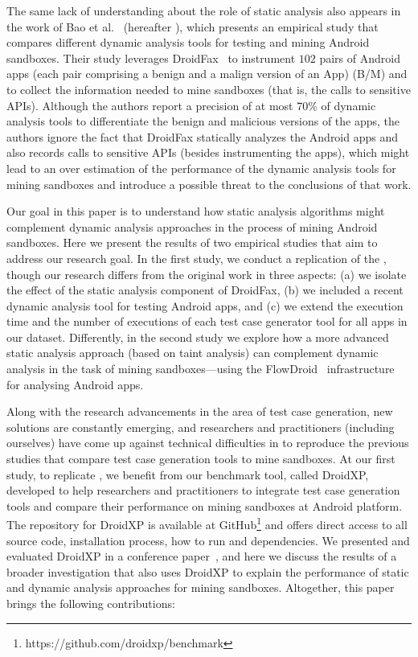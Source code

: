 The same lack of understanding about the role of static analysis also appears in the work of Bao et al.~\cite{DBLP:conf/wcre/BaoLL18} (hereafter \blls), which presents an empirical study that compares different dynamic analysis tools for testing and mining Android sandboxes. Their study leverages DroidFax~\cite{DBLP:conf/icsm/CaiR17a} to instrument $102$ pairs of Android apps (each pair comprising a benign and a malign version of an App) (B/M) and to collect the information needed to mine sandboxes (that is, the calls to sensitive APIs).
Although the authors report a precision of at most 70\% of dynamic analysis tools to differentiate the benign and malicious versions of the apps, the authors ignore the fact that DroidFax statically analyzes the Android apps and also records calls to sensitive APIs (besides instrumenting the apps), which might lead to an over estimation of the performance of the dynamic analysis tools for mining sandboxes and introduce a possible threat to the conclusions of that work.

Our goal in this paper is to understand how static analysis
algorithms might complement dynamic analysis approaches in the process of mining Android sandboxes. Here we
present the results of two empirical studies that aim to
address our research goal. In the
first study, we conduct a replication of the \blls, though our research differs from the original work in three aspects: (a)
we isolate the effect of the static analysis component of DroidFax, (b) we included a recent dynamic analysis tool for testing Android apps,
and (c) we extend the execution time and the number of executions of each test case generator tool for all apps
in our dataset. Differently, in the second study we explore how a more advanced static analysis approach
(based on taint analysis) can complement dynamic analysis in the task of mining sandboxes---using
the FlowDroid~\cite{DBLP:conf/pldi/ArztRFBBKTOM14} infrastructure for analysing Android apps.

Along with the research advancements in the area of test case generation, new solutions are constantly emerging, and researchers and practitioners (including ourselves) have come up against technical difficulties in to reproduce the previous studies that compare test case generation tools to mine sandboxes. At our first study, to replicate \blls, we benefit from our benchmark tool, called DroidXP, developed to help researchers and practitioners to integrate test case generation tools and compare
their performance on mining sandboxes at Android platform. The repository for DroidXP is available at GitHub\footnote{https://github.com/droidxp/benchmark} and offers direct access to all source code, installation process, how to run and dependencies. We presented and evaluated DroidXP in a conference paper~\cite{DBLP:conf/scam/CostaMCMVBC20}, and here we discuss the results of a broader investigation that also uses DroidXP to explain the performance of static and dynamic analysis
approaches for mining sandboxes. Altogether, this paper brings the following contributions:

